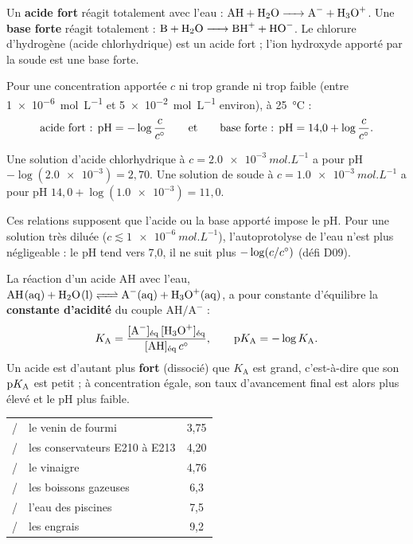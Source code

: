 \begin{definition}
Un \textbf{acide fort} réagit totalement avec l'eau : $\ce{AH + H2O -> A- + H3O+}$. Une \textbf{base forte} réagit
totalement : $\ce{B + H2O -> BH+ + HO-}$. Le chlorure d'hydrogène  (acide chlorhydrique) est un acide fort ;
l'ion hydroxyde apporté par la soude  est une base forte.
\end{definition}
\begin{propriete}
Pour une concentration apportée $c$ ni trop grande ni trop faible (entre \qty{1e-6}{mol.L^{-1}} et \qty{5e-2}{mol.L^{-1}}
environ), à 25~°C :
\[\text{acide fort : }\mathrm{pH}=-\log\frac{c}{c^{\circ}}\qquad\text{et}\qquad\text{base forte : }\mathrm{pH}=14{,}0+\log\frac{c}{c^{\circ}}.\]
\end{propriete}
\begin{exemple}
Une solution d'acide chlorhydrique à $c=\qty{2,0e-3}{mol.L^{-1}}$ a pour pH $-\log(\num{2.0e-3})=2{,}70$. Une solution
de soude à $c=\qty{1,0e-3}{mol.L^{-1}}$ a pour pH $14{,}0+\log(\num{1.0e-3})=11{,}0$.
\end{exemple}
\begin{attention}
Ces relations supposent que l'acide ou la base apporté impose le pH. Pour une solution très diluée
($c\lesssim\qty{1e-6}{mol.L^{-1}}$), l'autoprotolyse de l'eau n'est plus négligeable : le pH tend vers 7,0, il ne suit
plus $-\log(c/c^{\circ})$ (défi D09).
\end{attention}
\begin{definition}
La réaction d'un acide AH avec l'eau, $\ce{AH(aq) + H2O(l) <=> A^-(aq) + H3O^+(aq)}$, a pour constante d'équilibre la
\textbf{constante d'acidité} du couple $\mathrm{AH}/\mathrm{A}^-$ :
\[K_\mathrm{A}=\frac{[\ce{A-}]_\text{éq}\,[\ce{H3O+}]_\text{éq}}{[\ce{AH}]_\text{éq}\,\cst},\qquad \pKa=-\log K_\mathrm{A}.\]
Un acide est d'autant plus \textbf{fort} (dissocié) que $K_\mathrm{A}$ est grand, c'est-à-dire que son $\pKa$ est petit ;
à concentration égale, son taux d'avancement final est alors plus élevé et le pH plus faible.
\end{definition}
\begin{propriete}
\par\smallskip
{\small\renewcommand{\arraystretch}{1.25}
\begin{tabularx}{\linewidth}{@{}lYc@{}}\toprule
{} &  & \otTete{$\pKa$}\\\midrule
{}/ & le venin de fourmi & 3,75\\
/ & les conservateurs E210 à E213 & 4,20\\
/ & le vinaigre & 4,76\\
/ & les boissons gazeuses & 6,3\\
/ & l'eau des piscines & 7,5\\
/ & les engrais & 9,2\\\bottomrule
\end{tabularx}}
\end{propriete}

